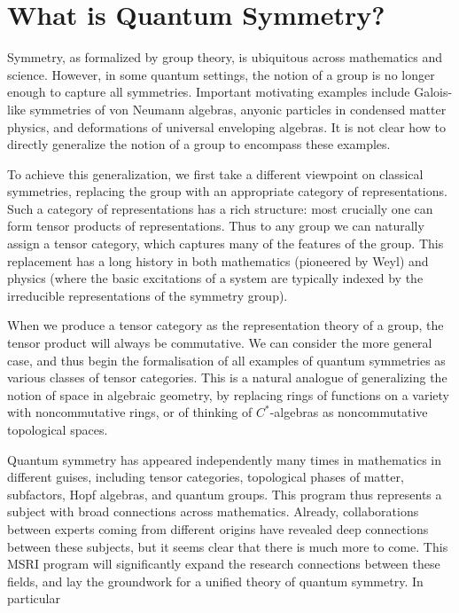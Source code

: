 \documentclass[12pt]{article}
\begin{document}
\section{What is Quantum Symmetry?}

Symmetry, as formalized by group theory, is ubiquitous across mathematics and science.  However, in some quantum settings, the notion of a group is no longer enough to capture all symmetries.  Important motivating examples include Galois-like symmetries of von Neumann algebras, anyonic particles in condensed matter physics, and deformations of universal enveloping algebras. It is not clear how to directly generalize the notion of a group to encompass these examples.

To achieve this generalization, we first take a different viewpoint on classical symmetries, replacing the group with an appropriate category of representations.  Such a category of representations has a rich structure: most crucially one can form tensor products of representations.  Thus to any group we can naturally assign a tensor category, which captures many of the features of the group. This replacement has a long history in both mathematics (pioneered by Weyl) and physics (where the basic excitations of a system are typically indexed by the irreducible representations of the symmetry group).

When we produce a tensor category as the representation theory of a group, the tensor product will always be commutative. We can consider the more general case, and thus begin the formalisation of all examples of quantum symmetries as various classes of tensor categories. This is a natural analogue of generalizing the notion of space in algebraic geometry, by replacing rings of functions on a variety with noncommutative rings, or of thinking of $C^*$-algebras as noncommutative topological spaces.

Quantum symmetry has appeared independently many times in mathematics in different guises, including tensor categories, topological phases of matter, subfactors, Hopf algebras, and quantum groups. This program thus represents a subject with broad connections across mathematics. Already, collaborations between experts coming from different origins have revealed deep connections between these subjects, but it seems clear that there is much more to come. This MSRI program will significantly expand the research connections between these fields, and lay the groundwork for a unified theory of quantum symmetry. In particular 
\end{document}
